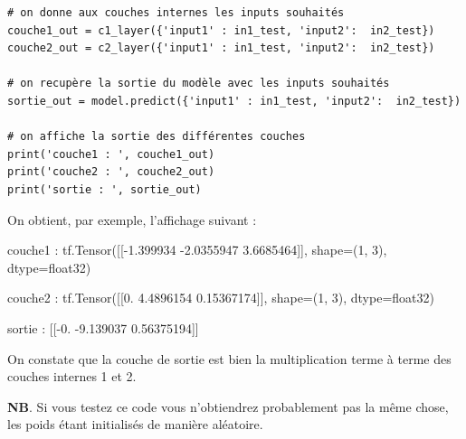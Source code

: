 \begin{itemize}[label=$\square$]
\begin{itemize}
\begin{lstlisting}
# on donne aux couches internes les inputs souhaités
couche1_out = c1_layer({'input1' : in1_test, 'input2':  in2_test})
couche2_out = c2_layer({'input1' : in1_test, 'input2':  in2_test})

# on recupère la sortie du modèle avec les inputs souhaités
sortie_out = model.predict({'input1' : in1_test, 'input2':  in2_test})

# on affiche la sortie des différentes couches 
print('couche1 : ', couche1_out)
print('couche2 : ', couche2_out)
print('sortie : ', sortie_out)
\end{lstlisting}

On obtient, par exemple, l'affichage suivant :

couche1 : tf.Tensor([[-1.399934  -2.0355947  3.6685464]], shape=(1, 3), dtype=float32)

couche2 : tf.Tensor([[0.         4.4896154  0.15367174]], shape=(1, 3), dtype=float32)

sortie : [[-0.         -9.139037    0.56375194]]

On constate que la couche de sortie est bien la multiplication terme à terme des couches internes 1 et 2.

\textbf{NB}. Si vous testez ce code vous n'obtiendrez probablement pas la même chose, les poids étant initialisés de manière aléatoire.

\end{itemize}
\end{itemize}

